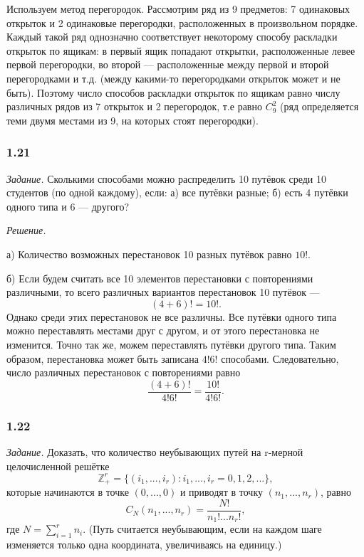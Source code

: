 \documentclass{book}
\begin{document}
Используем метод перегородок. Рассмотрим ряд из 9 предметов: 7 одинаковых открыток и 2 одинаковые перегородки, расположенных в произвольном порядке. Каждый такой ряд однозначно соответствует некоторому способу раскладки открыток по ящикам: в первый ящик попадают открытки, расположенные левее первой перегородки, во второй --- расположенные между первой и второй перегородками и т.д. (между какими-то перегородками открыток может и не быть). Поэтому число способов раскладки открыток по ящикам равно числу различных рядов из 7 открыток и 2 перегородок, т.е равно $C_9^2$ (ряд определяется теми двумя местами из 9, на которых стоят перегородки).

\subsubsection*{1.21}

\textit{Задание.} Сколькими способами можно распределить 10 путёвок среди 10 студентов (по одной каждому), если: а) все путёвки разные; б) есть 4 путёвки одного типа и 6 --- другого?

\textit{Решение.}

а) Количество возможных перестановок 10 разных путёвок равно $10!$.

б) Если будем считать все 10 элементов перестановки с повторениями различными, то всего различных вариантов перестановок 10 путёвок --- $$(4+6)!=10!.$$ Однако среди этих перестановок не все различны. Все путёвки одного типа можно переставлять местами друг с другом, и от этого перестановка не изменится. Точно так же, можем переставлять путёвки другого типа. Таким образом, перестановка может быть записана $4!6!$ способами. Следовательно, число различных перестановок с повторениями равно $$\frac{(4+6)!}{4!6!}=\frac{10!}{4!6!}.$$

\subsubsection*{1.22}

\textit{Задание.} Доказать, что количество неубывающих путей на r-мерной целочисленной решётке $$\mathbb{Z}_+^r=\{\left(i_1, ..., i_r\right): i_1, ..., i_r=0, 1, 2, ...\},$$ которые начинаются в точке $\left(0, ..., 0\right)$ и приводят в точку $\left(n_1, ..., n_r\right)$, равно $$C_N\left(n_1, ..., n_r\right)=\frac{N!}{n_1!...n_r!},$$ где $N=\sum\limits_{i=1}^rn_i$. (Путь считается неубывающим, если на каждом шаге изменяется только одна координата, увеличиваясь на единицу.)
\end{document}
